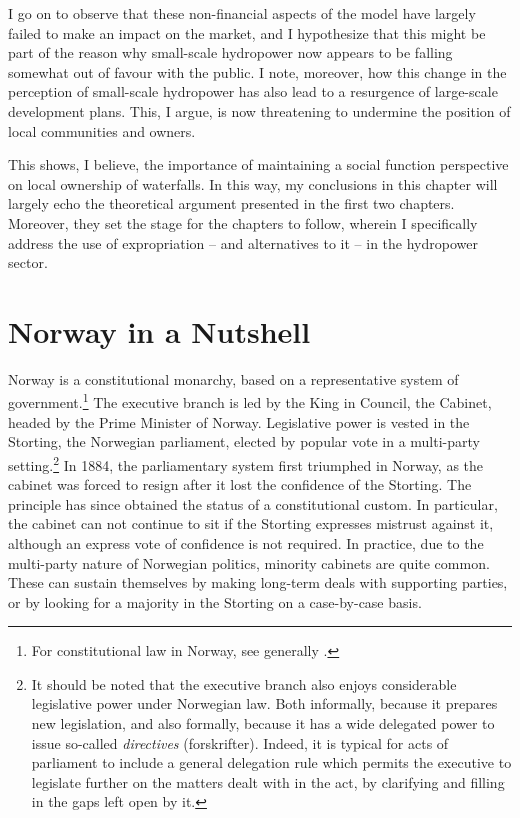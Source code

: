 I go on to observe that these non-financial aspects of the model have largely failed to make an impact on the market, and I hypothesize that this might be part of the reason why small-scale hydropower now appears to be falling somewhat out of favour with the public. I note, moreover, how this change in the perception of small-scale hydropower has also lead to a resurgence of large-scale development plans. This, I argue, is now threatening to undermine the position of local communities and owners.

This shows, I believe, the importance of maintaining a social function perspective on local ownership of waterfalls. In this way, my conclusions in this chapter will largely echo the theoretical argument presented in the first two chapters. Moreover, they set the stage for the chapters to follow, wherein I specifically address the use of expropriation -- and alternatives to it --  in the hydropower sector.

\section{Norway in a Nutshell}\label{sec:nutshell}

Norway is a constitutional monarchy, based on a representative system of government.\footnote{For constitutional law in Norway, see generally \cite{andenes06}.} The executive branch is led by the King in Council, the Cabinet, headed by the Prime Minister of Norway. Legislative power is vested in the Storting, the Norwegian parliament, elected by popular vote in a multi-party setting.\footnote{It should be noted that the executive branch also enjoys considerable legislative power under Norwegian law. Both informally, because it prepares new legislation, and also formally, because it has a wide delegated power to issue so-called {\it directives} (forskrifter). Indeed, it is typical for acts of parliament to include a general delegation rule which permits the executive to legislate further on the matters dealt with in the act, by clarifying and filling in the gaps left open by it.} In 1884, the parliamentary system first triumphed in Norway, as the cabinet was forced to resign after it lost the confidence of the Storting. The principle has since obtained the status of a constitutional custom. In particular, the cabinet can not continue to sit if the Storting expresses mistrust against it, although an express vote of confidence is not required. In practice, due to the multi-party nature of Norwegian politics, minority cabinets are quite common. These can sustain themselves by making long-term deals with supporting parties, or by looking for a majority in the Storting on a case-by-case basis.

